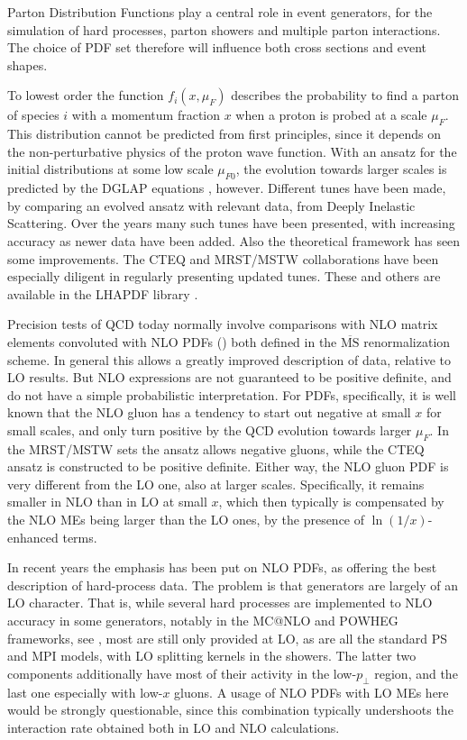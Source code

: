 
Parton Distribution Functions play a central role in event
generators, for the simulation of hard processes, parton showers 
and multiple parton interactions. The choice of PDF set therefore will 
influence both cross sections and event shapes.

To lowest order the function $f_i(x, \mu_F)$ describes the probability
to find a parton of species $i$ with a momentum fraction $x$ when a 
proton is probed at a scale $\mu_F$. This distribution cannot be predicted
from first principles, since it depends on the non-perturbative physics 
of the proton wave function. With an ansatz for the initial 
distributions at some low scale $\mu_{F0}$, the evolution towards larger 
scales is predicted by the DGLAP equations 
\cite{Gribov:1972ri,Dokshitzer:1977sg,Altarelli:1977zs}, however.
Different tunes have been made, by comparing an evolved ansatz with 
relevant data, \eg from Deeply Inelastic Scattering. Over the years
many such tunes have been presented, with increasing accuracy as newer
data have been added. Also the theoretical framework has seen some 
improvements. The CTEQ \cite{Lai:2010vv} and MRST/MSTW 
\cite{Martin:2009iq} collaborations have been especially diligent in 
regularly presenting updated tunes. These and others are available 
in the LHAPDF library \cite{Whalley:2005nh}.

Precision tests of QCD today normally involve comparisons with NLO 
matrix elements convoluted with NLO PDFs () 
both defined in the $\overline{\mathrm{MS}}$ renormalization scheme. In general 
this allows a greatly improved description of data, relative to LO 
results. But NLO expressions are not guaranteed to be positive definite, 
and do not have a simple probabilistic interpretation.
For PDFs, specifically, it is well known that the NLO gluon has a 
tendency to start out negative at small $x$ for small scales, and 
only turn positive by the QCD evolution towards larger $\mu_F$. In the 
MRST/MSTW sets the ansatz allows negative gluons, while the CTEQ ansatz
is constructed to be positive definite. Either way, the NLO gluon PDF
is very different from the LO one, also at larger scales. 
Specifically, it remains smaller in NLO than in LO at small $x$, which 
then typically is compensated by the NLO MEs being larger than the LO 
ones, by the presence of $\ln(1/x)$-enhanced terms.

In recent years the emphasis has been put on NLO PDFs, as offering the
best description of hard-process data. The problem is that generators
are largely of an LO character. That is, while several hard processes are 
implemented to NLO accuracy in some generators, notably in the MC@NLO 
and POWHEG frameworks, see , most
are still only 
provided at LO, as are all the standard PS and MPI models, \eg with 
LO splitting kernels in the showers. 
The latter two components additionally have most of their activity in 
the low-$p_{\perp}$ region, and the last one especially with low-$x$ 
gluons. A usage of NLO PDFs with LO MEs here would be strongly 
questionable, since this combination typically undershoots the 
interaction rate obtained both in LO and NLO calculations.

